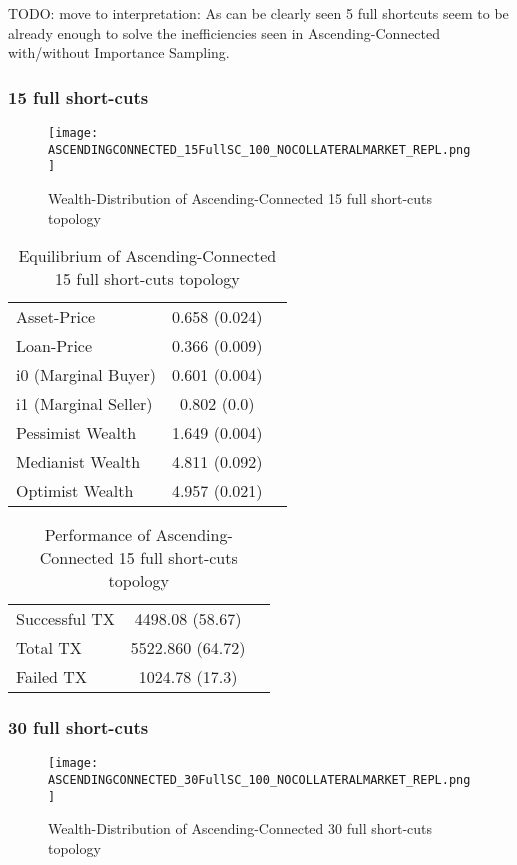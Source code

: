 \documentclass[Bachelorarbeit.tex]{subfiles}
\begin{document}
TODO: move to interpretation: As can be clearly seen 5 full shortcuts seem to be already enough to solve the inefficiencies seen in Ascending-Connected with/without Importance Sampling.

\subsubsection{15 full short-cuts}
\begin{figure}[H]
	\centering
  \texttt{[image: ASCENDINGCONNECTED\_15FullSC\_100\_NOCOLLATERALMARKET\_REPL.png]}
	\caption{Wealth-Distribution of Ascending-Connected 15 full short-cuts topology}
	\label{fig1}
\end{figure}

\begin{table}[h]
	\caption{Equilibrium of Ascending-Connected 15 full short-cuts topology}
	\centering
	\begin{tabular} { l c r }
		\hline
		Asset-Price & 0.658 (0.024) \\
		Loan-Price & 0.366 (0.009) \\
		i0 (Marginal Buyer) & 0.601 (0.004) \\
		i1 (Marginal Seller) & 0.802 (0.0) \\
		Pessimist Wealth & 1.649 (0.004) \\
		Medianist Wealth & 4.811 (0.092) \\
		Optimist Wealth & 4.957 (0.021) \\
		\hline
	\end{tabular}
\end{table} 

\begin{table}[H]
	\caption{Performance of Ascending-Connected 15 full short-cuts topology}
	\centering
	\begin{tabular} { l c r }
		\hline
		Successful TX & 4498.08 (58.67) \\
		Total TX & 5522.860 (64.72) \\
		Failed TX & 1024.78 (17.3) \\
		\hline
	\end{tabular}
\end{table}

\subsubsection{30 full short-cuts}
\begin{figure}[H]
	\centering
  \texttt{[image: ASCENDINGCONNECTED\_30FullSC\_100\_NOCOLLATERALMARKET\_REPL.png]}
	\caption{Wealth-Distribution of Ascending-Connected 30 full short-cuts topology}
	\label{fig1}
\end{figure}
\end{document}
